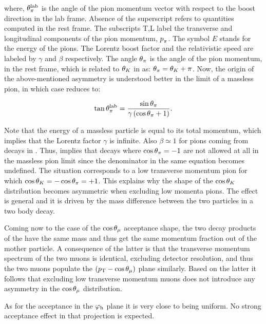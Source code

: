 \noindent where, $\theta_{\pi}^{\rm lab}$ is the angle of the pion momentum vector with respect to the boost direction
in the lab frame. Absence of the \lab superscript refers to quantities computed in the \Kstarz rest frame.
The subscripts T,L label the transverse and longitudinal components of the pion momentum, $\mbox{$p$}_{\pi}$.
The symbol $E$ stands for the energy of the pions. The Lorentz boost factor and the relativistic speed
are labeled by $\gamma$ and $\beta$ respectively. The angle $\theta_{\pi}$ is the angle of the pion momentum,
in the \Kstarz rest frame, which is related to $\theta_{K}$ in  as: $\theta_{\pi} = \theta_{K} + \pi$.
Now, the origin of the above-mentioned asymmetry is understood better in the limit of a massless pion,
in which case  reduces to:

\begin{equation}
  \centering
  \tan\thetapi^\lab = \frac{\sin\thetapi}{\gamma\parenthesis{\cos\thetapi + 1} }.
  \label{pi_angle_massless}
\end{equation}

\noindent Note that the energy of a massless particle is equal to its total momentum, which implies that
the Lorentz factor $\gamma$ is infinite. Also $\beta \simeq 1$ for pions coming from \BJpsiKpi decays in \lhcb.
Thus,  implies that decays where $\cos\theta_{\pi}=-1$ are not
allowed at all in the massless pion limit since the denominator in the same equation becomes undefined.
The situation corresponds to a low transverse momentum pion for which $\cos\theta_{K} = -\cos\theta_{\pi} = +1$.
This explains why the shape of the $\cos\theta_{K}$ distribution becomes asymmetric when excluding low momenta pions.
The effect is general and it is driven by the mass difference between the two particles in a two body decay.

Coming now to the case of the $\cos\theta_{\mu}$ acceptance shape, the two decay products of the \jpsi have
the same mass and thus get the same momentum fraction out of the mother \jpsi particle. A consequence of
the latter is that the transverse momentum spectrum of the two muons is identical, excluding detector
resolution, and thus the two muons populate the $(\mbox{$p_{\rm T}$}-\cos\theta_{\mu})$ plane similarly. Based on the latter
it follows that excluding low transverse momentum muons does not introduce any asymmetry in the $\cos\theta_{\mu}$ distribution.

As for the acceptance in the $\varphi_{\rm h}$ plane it is very close to being uniform.
No strong acceptance effect in that projection is expected.

